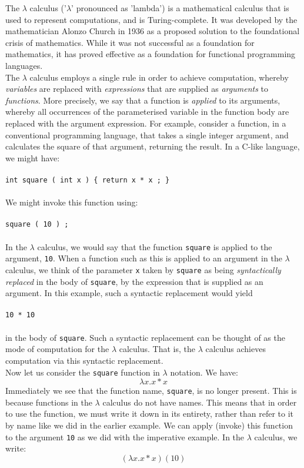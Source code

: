 \documentclass{article}
\begin{document}
The $\lambda$ calculus ('$\lambda$' pronounced as 'lambda') is a mathematical calculus that is used to represent computations, and is Turing-complete. It was developed by the mathematician Alonzo Church in 1936 as a proposed solution to the foundational crisis of mathematics. While it was not successful as a foundation for mathematics, it has proved effective as a foundation for functional programming languages.
\\
\indent The $\lambda$ calculus employs a single rule in order to achieve computation, whereby \emph{variables} are replaced with \emph{expressions} that are supplied as \emph{arguments} to \emph{functions}. More precisely, we say that a function is \emph{applied} to its arguments, whereby all occurrences of the parameterised variable in the function body are replaced with the argument expression. For example, consider a function, in a conventional programming language, that takes a single integer argument, and calculates the square of that argument, returning the result. In a C-like language, we might have:
\\\\
\indent \texttt{int square ( int x ) \{ return x * x ; \}}
\\\\
We might invoke this function using:
\\\\
\indent \texttt{square ( 10 ) ;}
\\\\
In the $\lambda$ calculus, we would say that the function \texttt{square} is applied to the argument, \texttt{10}. When a function such as this is applied to an argument in the $\lambda$ calculus, we think of the parameter \texttt{x} taken by \texttt{square} as being \emph{syntactically replaced} in the body of \texttt{square}, by the expression that is supplied as an argument. In this example, such a syntactic replacement would yield
\\\\
\indent \texttt{10 * 10}
\\\\
in the body of \texttt{square}. Such a syntactic replacement can be thought of as the mode of computation for the $\lambda$ calculus. That is, the $\lambda$ calculus achieves computation via this syntactic replacement.
\\
\indent Now let us consider the \texttt{square} function in $\lambda$ notation. We have:
\[ \lambda x.x * x \]
Immediately we see that the function name, \texttt{square}, is no longer present. This is because functions in the $\lambda$ calculus do not have names. This means that in order to use the function, we must write it down in its entirety, rather than refer to it by name like we did in the earlier example. We can apply (invoke) this function to the argument \texttt{10} as we did with the imperative example. In the $\lambda$ calculus, we write:
\[ (\lambda x.x * x)(10) \]
\\
\end{document}
